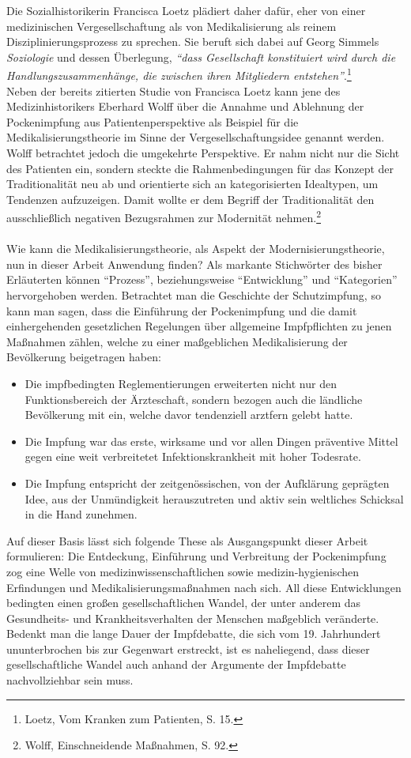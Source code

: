 \documentclass[
    a4paper,
    12pt,
    hyphens,
    chapterprefix=true,
    headheight=33pt,
    footheight=29pt,
    headings=optiontohead,
]{scrartcl}
\begin{document}
Die Sozialhistorikerin Francisca Loetz plädiert daher dafür, eher von einer medizinischen Vergesellschaftung als von Medikalisierung als reinem Disziplinierungsprozess zu sprechen. Sie beruft sich dabei auf Georg Simmels \textit{Soziologie} und dessen Überlegung, \textit{"`dass Gesellschaft konstituiert wird durch die Handlungszusammenhänge, die zwischen ihren Mitgliedern entstehen"'}.\footnote{Loetz, Vom Kranken zum Patienten, S. 15.}\\
Neben der bereits zitierten Studie von Francisca Loetz kann jene des Medizinhistorikers Eberhard Wolff über die Annahme und Ablehnung der Pockenimpfung aus Patientenperspektive als Beispiel für die Medikalisierungstheorie im Sinne der Vergesellschaftungsidee genannt werden. Wolff betrachtet jedoch die umgekehrte Perspektive. Er nahm nicht nur die Sicht des Patienten ein, sondern steckte die Rahmenbedingungen für das Konzept der Traditionalität neu ab und orientierte sich an kategorisierten Idealtypen, um Tendenzen aufzuzeigen. Damit wollte er dem Begriff der Traditionalität den ausschließlich negativen Bezugsrahmen zur Modernität nehmen.\footnote{Wolff, Einschneidende Maßnahmen, S. 92.}\\
\\
Wie kann die Medikalisierungstheorie, als Aspekt der Modernisierungstheorie, nun in dieser Arbeit Anwendung finden? Als markante Stichwörter des bisher Erläuterten können "`Prozess"', beziehungsweise "`Entwicklung"' und "`Kategorien"' hervorgehoben werden. Betrachtet man die Geschichte der Schutzimpfung, so kann man sagen, dass die Einführung der Pockenimpfung und die damit einhergehenden gesetzlichen Regelungen über allgemeine Impfpflichten zu jenen Maßnahmen zählen, welche zu einer maßgeblichen Medikalisierung der Bevölkerung beigetragen haben:
\begin{itemize}
\item{Die impfbedingten Reglementierungen erweiterten nicht nur den Funktionsbereich der Ärzteschaft, sondern bezogen auch die ländliche Bevölkerung mit ein, welche davor tendenziell arztfern gelebt hatte.}
\item{Die Impfung war das erste, wirksame und vor allen Dingen präventive Mittel gegen eine weit verbreitetet Infektionskrankheit mit hoher Todesrate.}
\item{Die Impfung entspricht der zeitgenössischen, von der Aufklärung geprägten Idee, aus der Unmündigkeit herauszutreten und aktiv sein weltliches Schicksal in die Hand zunehmen.}
\end{itemize}
Auf dieser Basis lässt sich folgende These als Ausgangspunkt dieser Arbeit formulieren: Die Entdeckung, Einführung und Verbreitung der Pockenimpfung zog eine Welle von medizinwissenschaftlichen sowie medizin-hygienischen Erfindungen und Medikalisierungsmaßnahmen nach sich. All diese Entwicklungen bedingten einen großen gesellschaftlichen Wandel, der unter anderem das Gesundheits- und Krankheitsverhalten der Menschen maßgeblich veränderte. Bedenkt man die lange Dauer der Impfdebatte, die sich vom 19. Jahrhundert ununterbrochen bis zur Gegenwart erstreckt, ist es naheliegend, dass dieser gesellschaftliche Wandel auch anhand der Argumente der Impfdebatte nachvollziehbar sein muss.
\end{document}
